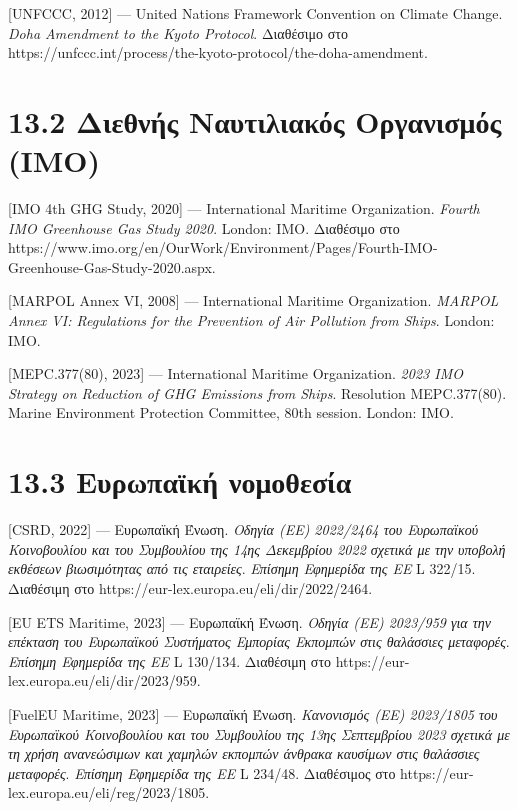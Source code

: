 {[}UNFCCC, 2012{]} --- United Nations Framework Convention on Climate
Change. \emph{Doha Amendment to the Kyoto Protocol}. Διαθέσιμο στο
https://unfccc.int/process/the-kyoto-protocol/the-doha-amendment.

\section{13.2 Διεθνής Ναυτιλιακός Οργανισμός
(IMO)}\label{ux3b4ux3b9ux3b5ux3b8ux3bdux3aeux3c2-ux3bdux3b1ux3c5ux3c4ux3b9ux3bbux3b9ux3b1ux3baux3ccux3c2-ux3bfux3c1ux3b3ux3b1ux3bdux3b9ux3c3ux3bcux3ccux3c2-imo}

{[}IMO 4th GHG Study, 2020{]} --- International Maritime Organization.
\emph{Fourth IMO Greenhouse Gas Study 2020}. London: IMO. Διαθέσιμο στο
https://www.imo.org/en/OurWork/Environment/Pages/Fourth-IMO-Greenhouse-Gas-Study-2020.aspx.

{[}MARPOL Annex VI, 2008{]} --- International Maritime Organization.
\emph{MARPOL Annex VI: Regulations for the Prevention of Air Pollution
from Ships}. London: IMO.

{[}MEPC.377(80), 2023{]} --- International Maritime Organization.
\emph{2023 IMO Strategy on Reduction of GHG Emissions from Ships}.
Resolution MEPC.377(80). Marine Environment Protection Committee, 80th
session. London: IMO.

\section{13.3 Ευρωπαϊκή
νομοθεσία}\label{ux3b5ux3c5ux3c1ux3c9ux3c0ux3b1ux3caux3baux3ae-ux3bdux3bfux3bcux3bfux3b8ux3b5ux3c3ux3afux3b1}

{[}CSRD, 2022{]} --- Ευρωπαϊκή Ένωση. \emph{Οδηγία (ΕΕ) 2022/2464 του
Ευρωπαϊκού Κοινοβουλίου και του Συμβουλίου της 14ης Δεκεμβρίου 2022
σχετικά με την υποβολή εκθέσεων βιωσιμότητας από τις εταιρείες}.
\emph{Επίσημη Εφημερίδα της ΕΕ} L 322/15. Διαθέσιμη στο
https://eur-lex.europa.eu/eli/dir/2022/2464.

{[}EU ETS Maritime, 2023{]} --- Ευρωπαϊκή Ένωση. \emph{Οδηγία (ΕΕ)
2023/959 για την επέκταση του Ευρωπαϊκού Συστήματος Εμπορίας Εκπομπών
στις θαλάσσιες μεταφορές}. \emph{Επίσημη Εφημερίδα της ΕΕ} L 130/134.
Διαθέσιμη στο https://eur-lex.europa.eu/eli/dir/2023/959.

{[}FuelEU Maritime, 2023{]} --- Ευρωπαϊκή Ένωση. \emph{Κανονισμός (ΕΕ)
2023/1805 του Ευρωπαϊκού Κοινοβουλίου και του Συμβουλίου της 13ης
Σεπτεμβρίου 2023 σχετικά με τη χρήση ανανεώσιμων και χαμηλών εκπομπών
άνθρακα καυσίμων στις θαλάσσιες μεταφορές}. \emph{Επίσημη Εφημερίδα της
ΕΕ} L 234/48. Διαθέσιμος στο
https://eur-lex.europa.eu/eli/reg/2023/1805.

